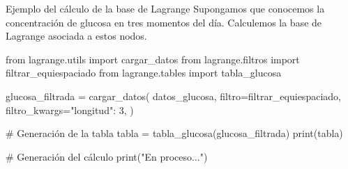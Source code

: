 \begin{frame}[fragile]{Ejemplo del cálculo de la base de Lagrange}
  Supongamos que conocemos la concentración de glucosa en tres momentos del
  día. Calculemos la base de Lagrange asociada a estos nodos.

  \begin{multicols}{2}
    \begin{pycode}
      from lagrange.utils import cargar_datos
      from lagrange.filtros import filtrar_equiespaciado
      from lagrange.tables import tabla_glucosa

      glucosa_filtrada = cargar_datos(
        datos_glucosa,
        filtro=filtrar_equiespaciado,
        filtro_kwargs={"longitud": 3},
      )
    \end{pycode}

    \begin{pycode}
      # Generación de la tabla
      tabla = tabla_glucosa(glucosa_filtrada)
      print(tabla)
    \end{pycode}

    \columnbreak

    \begin{pycode}
      # Generación del cálculo
      print("En proceso...")
    \end{pycode}
  \end{multicols}
\end{frame}
